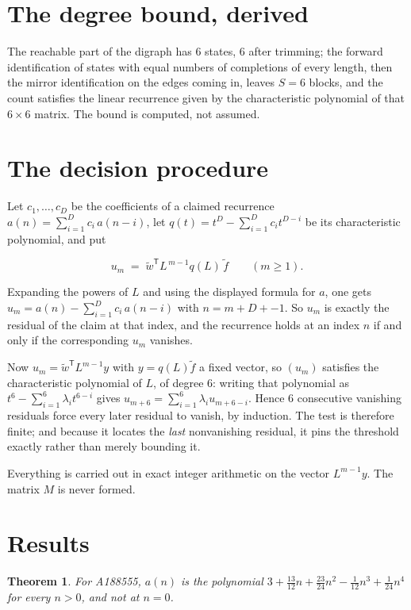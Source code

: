 \documentclass[11pt]{article}
\newtheorem{theorem}{Theorem}
\theoremstyle{definition}
\begin{document}
\section{The degree bound, derived}

The reachable part of the digraph has $6$ states, $6$ after trimming; the forward identification of states with equal numbers of completions of every length, then the mirror identification on the edges coming in, leaves $S = 6$ blocks, and the count satisfies the linear recurrence given by the characteristic polynomial of that $6\times6$ matrix. The bound is computed, not assumed.

\section{The decision procedure}

Let $c_1,\dots,c_D$ be the coefficients of a claimed recurrence $a(n) = \sum_{i=1}^{D} c_i\,a(n-i)$, let $q(t) = t^{D} - \sum_{i=1}^{D} c_i t^{D-i}$ be its characteristic polynomial, and put

\[u_m \;=\; \tilde w^{\mathsf T} L^{\,m-1} q(L)\,\tilde f \qquad (m \ge 1).\]

Expanding the powers of $L$ and using the displayed formula for $a$, one gets $u_m = a(n) - \sum_{i=1}^{D} c_i\,a(n-i)$ with $n = m + D + -1$. So $u_m$ is exactly the residual of the claim at that index, and the recurrence holds at an index $n$ if and only if the corresponding $u_m$ vanishes.

Now $u_m = \tilde w^{\mathsf T} L^{m-1} y$ with $y = q(L)\tilde f$ a fixed vector, so $(u_m)$ satisfies the characteristic polynomial of $L$, of degree $6$: writing that polynomial as $t^{6} - \sum_{i=1}^{6} \lambda_i t^{6-i}$ gives $u_{m+6} = \sum_{i=1}^{6} \lambda_i u_{m+6-i}$. Hence $6$ consecutive vanishing residuals force every later residual to vanish, by induction. The test is therefore finite; and because it locates the {\itshape last} nonvanishing residual, it pins the threshold exactly rather than merely bounding it.

Everything is carried out in exact integer arithmetic on the vector $L^{m-1}y$. The matrix $M$ is never formed.

\section{Results}

\begin{theorem} For A188555, $a(n)$ is the polynomial $3 + \frac{13}{12}n + \frac{23}{24}n^{2} - \frac{1}{12}n^{3} + \frac{1}{24}n^{4}$ for every $n > 0$, and not at $n = 0$.\end{theorem}
\end{document}
